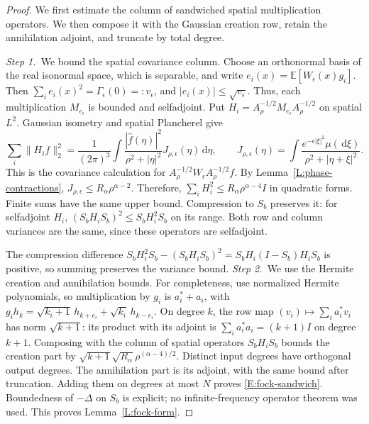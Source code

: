 \documentclass[12pt,oneside,openany]{book}
\numberwithin{equation}{section}
\theoremstyle{nogostyle}
\theoremstyle{definition}
\newcommand{\E}{\mathbb{E}}
\newcommand{\ud}{\,\mathrm{d}}
\begin{document}
\begin{proof}
  We first estimate the column of sandwiched spatial multiplication operators.
  We then compose it with the Gaussian creation row, retain the annihilation
  adjoint, and truncate by total degree.


  \medskip
  \noindent\textit{Step 1.~}We bound the spatial covariance column.
  Choose an orthonormal basis of the real isonormal space, which is separable,
  and write $e_i(x) = \E[W_\epsilon(x)g_i]$. Then $\sum_i e_i(x)^2 =
  \Gamma_\epsilon(0) = :v_\epsilon$, and $|e_i(x)| \le \sqrt{v_\epsilon}$. Thus,
  each multiplication $M_{e_i}$ is bounded and selfadjoint. Put $H_i =
  A_\rho^{-1/2}M_{e_i}A_\rho^{-1/2}$ on spatial $L^2$. Gaussian isometry and
  spatial Plancherel give
  \[
    \sum_i\|H_i f\|_2^2
    =\frac1{(2\pi)^3}\int
    \frac{|\widehat{f}(\eta)|^2}{\rho^2+|\eta|^2}
    J_{\rho,\epsilon}(\eta)\ud\eta,\qquad
    J_{\rho,\epsilon}(\eta)
    =\int\frac{e^{-\epsilon|\xi|^2}\mu(\ud\xi)}
    {\rho^2+|\eta+\xi|^2}.
  \]
  This is the covariance calculation for $A_\rho^{-1/2}W_\epsilon
  A_\rho^{-1/2}f$. By Lemma~\ref{L:phase-contractions}, $J_{\rho,\epsilon} \le
  R_\alpha\rho^{\alpha-2}$. Therefore, $\sum_i H_i^2 \le
  R_\alpha\rho^{\alpha-4}I$ in quadratic forms. Finite sums have the same upper
  bound. Compression to $S_b$ preserves it: for selfadjoint $H_i$,
  $(S_bH_iS_b)^2 \le S_bH_i^2S_b$ on its range. Both row and column variances
  are the same, since these operators are selfadjoint.


  The compression difference $S_bH_i^2S_b-(S_bH_iS_b)^2=S_bH_i(I-S_b)H_iS_b$
  is positive, so summing preserves the variance bound.
  \medskip
  \noindent\textit{Step 2.~}We use the Hermite creation and annihilation
  bounds.
  For completeness, use normalized Hermite polynomials, so multiplication by
  $g_i$ is $a_i^*+a_i$, with $g_i h_k =
  \sqrt{k_i+1}\,h_{k+e_i}+\sqrt{k_i}\,h_{k-e_i}$. On degree $k$, the row map
  $(v_i)\mapsto\sum_i a_i^*v_i$ has norm $\sqrt{k+1}$: its product with its
  adjoint is $\sum_i a_i^*a_i = (k+1)I$ on degree $k+1$. Composing with the
  column of spatial operators $S_bH_iS_b$ bounds the creation part by
  $\sqrt{k+1}\sqrt{R_\alpha}\rho^{(\alpha-4)/2}$. Distinct input degrees have
  orthogonal output degrees. The annihilation part is its adjoint, with the same
  bound after truncation. Adding them on degrees at most $N$ proves
  \eqref{E:fock-sandwich}. Boundedness of $-\Delta$ on $S_b$ is explicit; no
  infinite-frequency operator theorem was used. This proves
  Lemma~\ref{L:fock-form}.
\end{proof}
\end{document}
